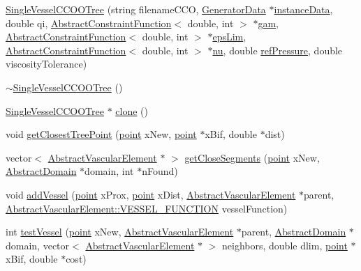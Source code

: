 \begin{DoxyCompactItemize}
\hyperlink{class_single_vessel_c_c_o_o_tree_a3b95648509148c82901f8f930ed06b1c}{Single\+Vessel\+C\+C\+O\+O\+Tree} (string filename\+C\+CO, \hyperlink{class_generator_data}{Generator\+Data} $\ast$\hyperlink{class_abstract_object_c_c_o_tree_aca7aecbd89dadc46dd9dce14cfde31e1}{instance\+Data}, double qi, \hyperlink{class_abstract_constraint_function}{Abstract\+Constraint\+Function}$<$ double, int $>$ $\ast$\hyperlink{class_abstract_object_c_c_o_tree_aad315b93744637e18153c4434dac067d}{gam}, \hyperlink{class_abstract_constraint_function}{Abstract\+Constraint\+Function}$<$ double, int $>$ $\ast$\hyperlink{class_abstract_object_c_c_o_tree_a62d3e1ff7e74a6236422273f58fc6012}{eps\+Lim}, \hyperlink{class_abstract_constraint_function}{Abstract\+Constraint\+Function}$<$ double, int $>$ $\ast$\hyperlink{class_abstract_object_c_c_o_tree_a92e6b6d1a2fac7331eee34fb28158828}{nu}, double \hyperlink{class_abstract_object_c_c_o_tree_ae7215e6237e4d04625a0c96be9f3578d}{ref\+Pressure}, double viscosity\+Tolerance)
\item 
\hyperlink{class_single_vessel_c_c_o_o_tree_a1c137ac564fb37adef0830032e68e0e0}{$\sim$\+Single\+Vessel\+C\+C\+O\+O\+Tree} ()
\item 
\hyperlink{class_single_vessel_c_c_o_o_tree}{Single\+Vessel\+C\+C\+O\+O\+Tree} $\ast$ \hyperlink{class_single_vessel_c_c_o_o_tree_acff17f1c7f1c69539d94f86e0ffbe267}{clone} ()
\item 
void \hyperlink{class_single_vessel_c_c_o_o_tree_aac665cdb3fa0687f579ef844ac47c5a7}{get\+Closest\+Tree\+Point} (\hyperlink{structpoint}{point} x\+New, \hyperlink{structpoint}{point} $\ast$x\+Bif, double $\ast$dist)
\item 
vector$<$ \hyperlink{class_abstract_vascular_element}{Abstract\+Vascular\+Element} $\ast$ $>$ \hyperlink{class_single_vessel_c_c_o_o_tree_a2c33f20925efececc655c7b8d89c93ed}{get\+Close\+Segments} (\hyperlink{structpoint}{point} x\+New, \hyperlink{class_abstract_domain}{Abstract\+Domain} $\ast$domain, int $\ast$n\+Found)
\item 
void \hyperlink{class_single_vessel_c_c_o_o_tree_ae9f08ba67c5a9a13b17313c9e86ccaa8}{add\+Vessel} (\hyperlink{structpoint}{point} x\+Prox, \hyperlink{structpoint}{point} x\+Dist, \hyperlink{class_abstract_vascular_element}{Abstract\+Vascular\+Element} $\ast$parent, \hyperlink{class_abstract_vascular_element_a7d7b7863aae4952ba79a590ee65702ec}{Abstract\+Vascular\+Element\+::\+V\+E\+S\+S\+E\+L\+\_\+\+F\+U\+N\+C\+T\+I\+ON} vessel\+Function)
\item 
int \hyperlink{class_single_vessel_c_c_o_o_tree_a4efc4561ed2de4d186b16d5b3c006fc2}{test\+Vessel} (\hyperlink{structpoint}{point} x\+New, \hyperlink{class_abstract_vascular_element}{Abstract\+Vascular\+Element} $\ast$parent, \hyperlink{class_abstract_domain}{Abstract\+Domain} $\ast$domain, vector$<$ \hyperlink{class_abstract_vascular_element}{Abstract\+Vascular\+Element} $\ast$ $>$ neighbors, double dlim, \hyperlink{structpoint}{point} $\ast$x\+Bif, double $\ast$cost)

\end{DoxyCompactItemize}
